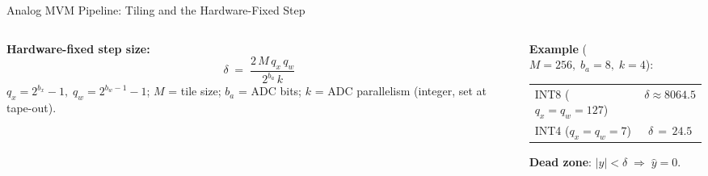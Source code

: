 \begin{frame}[shrink=15]{Analog MVM Pipeline: Tiling and the Hardware-Fixed Step}
  \vspace{0.5em}
  \begin{columns}[T]
    \begin{column}{0.52\textwidth}
      \footnotesize
      \textbf{Hardware-fixed step size:}
      \[
        \boxed{\; \delta \;=\; \frac{2\,M\,q_x\,q_w}{2^{b_a}\,k} \;}
      \]
      \scriptsize
      $q_x = 2^{b_x}{-}1,\; q_w = 2^{b_w-1}{-}1$; $M$ = tile size; $b_a$ = ADC bits; $k$ = ADC parallelism (integer, set at tape-out).
    \end{column}
    \begin{column}{0.46\textwidth}
      \footnotesize\renewcommand{\arraystretch}{1.2}
      \textbf{Example} ($M{=}256,\; b_a{=}8,\; k{=}4$):\\
      \begin{tabular}{@{}l c@{}}
        \toprule
        INT8 ($q_x{=}q_w{=}127$)  & $\delta \approx \mathbf{8064.5}$ \\
        INT4 ($q_x{=}q_w{=}7$)    & $\delta \,=\, \mathbf{24.5}$ \\
        \bottomrule
      \end{tabular}

      \vspace{0.4em}
      \alert{\textbf{Dead zone}:} $|y|{<}\delta \;\Rightarrow\; \hat y{=}0$.
    \end{column}
  \end{columns}

\end{frame}
